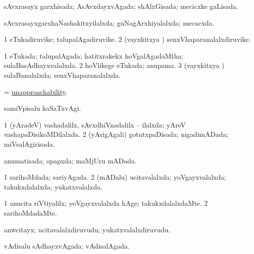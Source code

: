 \bentry
{} 
\gl{\gu}
\expl{}
\bmng
sAvxrasayx garxhisada; AsAvxdayxvAgada; shAlxGisada; mecicxke gaLisada. 
\emng
\eentry

\bentry
{} 
\gl{\gu}
\expl{}
\bmng
sAvxrasayxgarxhaNashakitxyilalxda; guNagArxhiyalalxda; mecacxda. 
\emng
\eentry

\bentry
{} 
\gl{\nA}
\expl{}
\bmng
\bnum
\num{1} eTukadiruvike; talupalAgadiruvike. 
\num{2} (vayxkitxya \vi) senxVhaparanalalxdiruvike. 
\enum
\emng
\eentry

\bentry
{} 
\gl{\gu}
\expl{}
\bmng
\bnum
\num{1} eTukada; talupalAgada; hatitxrakekx hoVgalAgadaMtha; sulaBasAdhayxvalalxda. 
\num{2} hoVlikege eTukada; anupama. 
\num{3} (vayxkitxya \vi) sulaBanalalxda; senxVhaparanalalxda. 
\enum
\emng
\eentry

\bentry
{} 
\gl{\nA}
\expl{}
\bmng
= \hyperlink{unapproachability}{unapproachability}. 
\emng
\eentry

\bentry
{} 
\gl{\kirxvi}
\expl{}
\bmng
samiVpisalu kaSaTxvAgi. 
\emng
\eentry

\bentry
{} 
\gl{\gu}
\expl{}
\bmng
\bnum
\num{1} (yAradeV) vashadalilx, sAvxdhiVnadalilx -- ilalxda; yAreV vashapaDisikoMDilalxda. 
\num{2} (yArigAgali) gotutxpaDisada; nigadimADada; miVsalAgirisada. 
\enum
\emng
\eentry

\bentry
{} 
\gl{\gu}
\expl{}
\bmng
anumatisada; opapxda; maMjUru mADada. 
\emng
\eentry

\bentry
{} 
\gl{\gu}
\expl{}
\bmng
\bnum
\num{1} sarihoMdada; sariyAgada. 
\num{2} (mADalu) ucitavalalxda; yoVgayxvalalxda; takukxdalalxda; yukatxvalalxda. 
\enum
\emng
\eentry

\bentry
{} 
\gl{\kirxvi}
\bmng
\bnum
\num{1} anucita riVtiyalilx; yoVgayxvalalxda hAge; takukxdalalxdaMte. 
\num{2} sarihoMdadaMte. 
\enum
\emng
\eentry

\bentry
{} 
\gl{\nA}
\expl{}
\bmng
anwcitayx; ucitavalalxdiruvudu; yukatxvalalxdiruvudu. 
\emng
\eentry

\bentry
{} 
\gl{\gu}
\expl{}
\bmng
vAdisalu sAdhayxvAgada; vAdisalAgada. 
\emng
\eentry

